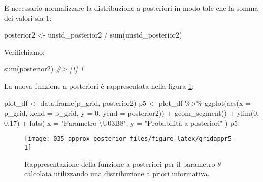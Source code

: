 \documentclass[
]{memoir}
\newenvironment{Shaded}{\begin{snugshade}}{\end{snugshade}}
\newcommand{\AttributeTok}[1]{\textcolor[rgb]{0.77,0.63,0.00}{#1}}
\newcommand{\CommentTok}[1]{\textcolor[rgb]{0.56,0.35,0.01}{\textit{#1}}}
\newcommand{\DecValTok}[1]{\textcolor[rgb]{0.00,0.00,0.81}{#1}}
\newcommand{\FloatTok}[1]{\textcolor[rgb]{0.00,0.00,0.81}{#1}}
\newcommand{\FunctionTok}[1]{\textcolor[rgb]{0.00,0.00,0.00}{#1}}
\newcommand{\NormalTok}[1]{#1}
\newcommand{\OtherTok}[1]{\textcolor[rgb]{0.56,0.35,0.01}{#1}}
\newcommand{\SpecialCharTok}[1]{\textcolor[rgb]{0.00,0.00,0.00}{#1}}
\newcommand{\StringTok}[1]{\textcolor[rgb]{0.31,0.60,0.02}{#1}}
\begin{document}
\noindent
È necessario normalizzare la distribuzione a posteriori in modo tale che la somma dei valori sia 1:

\begin{Shaded}
\begin{Highlighting}[]
\NormalTok{posterior2 }\OtherTok{\textless{}{-}}\NormalTok{ unstd\_posterior2 }\SpecialCharTok{/} \FunctionTok{sum}\NormalTok{(unstd\_posterior2)}
\end{Highlighting}
\end{Shaded}

\noindent
Verifichiamo:

\begin{Shaded}
\begin{Highlighting}[]
\FunctionTok{sum}\NormalTok{(posterior2)}
\CommentTok{\#\textgreater{} [1] 1}
\end{Highlighting}
\end{Shaded}

\noindent
La nuova funzione a posteriori è rappresentata nella figura \ref{fig:gridappr5}:

\begin{Shaded}
\begin{Highlighting}[]
\NormalTok{plot\_df }\OtherTok{\textless{}{-}} \FunctionTok{data.frame}\NormalTok{(p\_grid, posterior2)}
\NormalTok{p5 }\OtherTok{\textless{}{-}}\NormalTok{ plot\_df }\SpecialCharTok{\%\textgreater{}\%}
  \FunctionTok{ggplot}\NormalTok{(}\FunctionTok{aes}\NormalTok{(}\AttributeTok{x =}\NormalTok{ p\_grid, }\AttributeTok{xend =}\NormalTok{ p\_grid, }\AttributeTok{y =} \DecValTok{0}\NormalTok{, }\AttributeTok{yend =}\NormalTok{ posterior2)) }\SpecialCharTok{+}
  \FunctionTok{geom\_segment}\NormalTok{() }\SpecialCharTok{+}
  \FunctionTok{ylim}\NormalTok{(}\DecValTok{0}\NormalTok{, }\FloatTok{0.17}\NormalTok{) }\SpecialCharTok{+}
  \FunctionTok{labs}\NormalTok{(}
    \AttributeTok{x =} \StringTok{"Parametro \textbackslash{}U03B8"}\NormalTok{,}
    \AttributeTok{y =} \StringTok{"Probabilità a posteriori"}
\NormalTok{  )}
\NormalTok{p5}
\end{Highlighting}
\end{Shaded}

\begin{figure}

{\centering \texttt{[image: 035\_approx\_posterior\_files/figure-latex/gridappr5-1]} 

}

\caption{Rappresentazione della funzione a posteriori per il parametro $\theta$ calcolata utilizzando una distribuzione a priori informativa.}\label{fig:gridappr5}
\end{figure}
\end{document}
